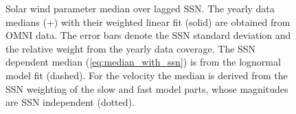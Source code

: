 \begin{figure}
	\caption{Solar wind parameter median over lagged SSN. The yearly data medians (+) with their weighted linear fit (solid) are obtained from OMNI data. The error bars denote the SSN standard deviation and the relative weight from the yearly data coverage. The SSN dependent median (\ref{eq:median_with_ssn}) is from the lognormal model fit (dashed). For the velocity the median is derived from the SSN weighting of the slow and fast model parts, whose magnitudes are SSN independent (dotted).}
	\label{fig:OMNI_yearly_BVNTvsSSN_a}
\end{figure}

